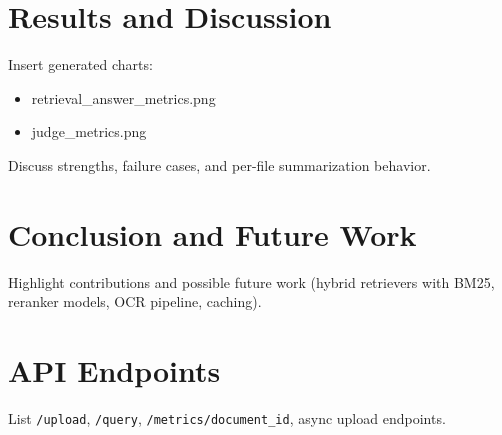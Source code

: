\documentclass[12pt,a4paper]{report}
\begin{document}
\chapter{Results and Discussion}
Insert generated charts:
\begin{itemize}
  \item retrieval\_answer\_metrics.png
  \item judge\_metrics.png
\end{itemize}
Discuss strengths, failure cases, and per-file summarization behavior.

\chapter{Conclusion and Future Work}
Highlight contributions and possible future work (hybrid retrievers with BM25, reranker models, OCR pipeline, caching).

\appendix
\chapter{API Endpoints}
List \texttt{/upload}, \texttt{/query}, \texttt{/metrics/{document\_id}}, async upload endpoints.
\end{document}
